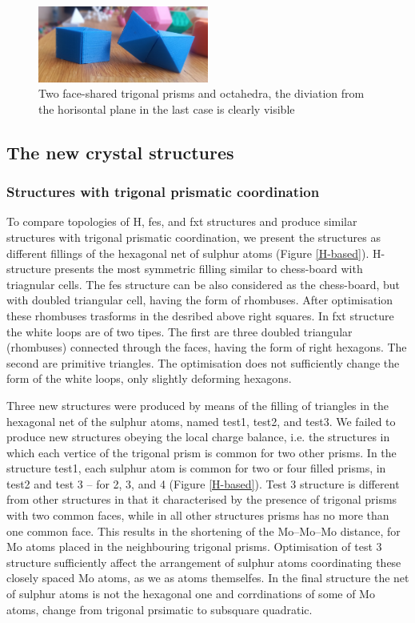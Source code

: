 \documentclass[a4paperm]{article}
\begin{document}
\begin{figure}[H] \centering
	\includegraphics[width=0.5\textwidth]{2prism_oct.jpg}
	\caption{Two face-shared trigonal prisms and octahedra, the diviation from the horisontal plane in the last case is clearly visible}
\label{2prism_oct.jpg}
\end{figure}


		\subsection{The new crystal structures}


\subsubsection{Structures with trigonal prismatic coordination}

To compare topologies of H, fes, and fxt structures and produce similar structures with trigonal prismatic coordination, we present the structures as different fillings of the hexagonal net of sulphur atoms (Figure \ref{H-based}).
H-structure presents the most symmetric filling similar to chess-board with triagnular cells.
The fes structure can be also considered as the chess-board, but with doubled triangular cell, having the form of rhombuses.
After optimisation these rhombuses trasforms in the desribed above right squares.
In fxt structure the white loops are of two tipes.
The first are three doubled triangular (rhombuses) connected through the faces, having the form of right hexagons.
The second are primitive triangles.
The optimisation does not sufficiently change the form of the white loops, only slightly deforming hexagons.


Three new structures were produced by means of the filling of triangles in the hexagonal net of the sulphur atoms, named test1, test2, and test3.
We failed to produce new structures obeying the local charge balance, i.e. the structures in which each vertice of the trigonal prism is common for two other prisms.
In the structure test1, each sulphur atom is common for two or four filled prisms, in test2 and test 3 – for 2, 3, and 4 (Figure \ref{H-based}).
Test 3 structure is different from other structures in that it characterised by the presence of trigonal prisms with two common faces, while in all other structures prisms has no more than one common face.
This results in the shortening of the Mo--Mo--Mo distance, for Mo atoms placed in the neighbouring trigonal prisms.
Optimisation of test 3 structure sufficiently affect the arrangement of sulphur atoms coordinating these closely spaced Mo atoms, as we as atoms themselfes.
In the final structure the net of sulphur atoms is not the hexagonal one and corrdinations of some of Mo atoms, change from trigonal prsimatic to subsquare quadratic.
\end{document}
